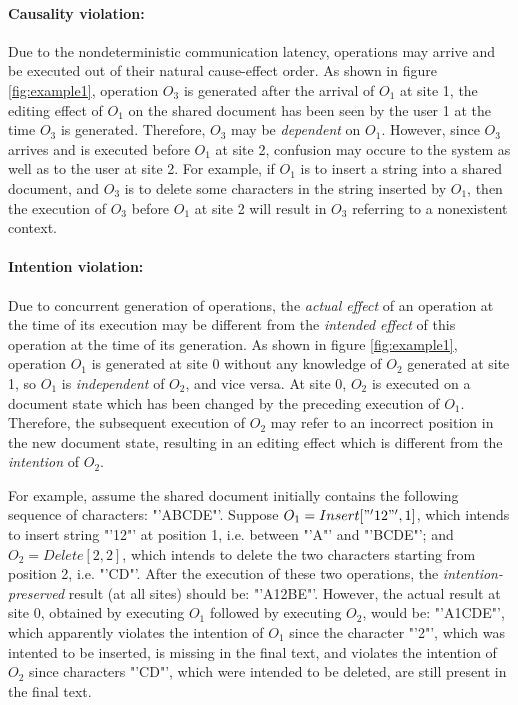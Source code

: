 \documentclass[11pt,a4paper]{article}
\begin{document}
\paragraph{Causality violation:}
Due to the nondeterministic communication latency, operations may arrive and be executed out of their natural cause-effect order. As shown in figure \ref{fig:example1}, operation $O_{3}$ is generated after the arrival of $O_{1}$ at site 1, the editing effect of $O_{1}$ on the shared document has been seen by the user 1 at the time $O_{3}$ is generated. Therefore, $O_{3}$ may be \emph{dependent} on $O_{1}$. However, since $O_{3}$ arrives and is executed before $O_{1}$ at site 2, confusion may occure to the system as well as to the user at site 2. For example, if $O_{1}$ is to insert a string into a shared document, and $O_{3}$ is to delete some characters in the string inserted by $O_{1}$, then the execution of $O_{3}$ before $O_{1}$ at site 2 will result in $O_{3}$ referring to a nonexistent context. 

\paragraph{Intention violation:}
Due to concurrent generation of operations, the \emph{actual effect} of an operation at the time of its execution may be different from the \emph{intended effect} of this operation at the time of its generation. As shown in figure \ref{fig:example1}, operation $O_{1}$ is generated at site 0 without any knowledge of $O_{2}$ generated at site 1, so $O_{1}$ is \emph{independent} of $O_{2}$, and vice versa. At site 0, $O_{2}$ is executed on a document state which has been changed by the preceding execution of $O_{1}$. Therefore, the subsequent execution of $O_{2}$ may refer to an incorrect position in the new document state, resulting in an editing effect which is different from the \emph{intention} of $O_{2}$. 

For example, assume the shared document initially contains the following sequence of characters: "'ABCDE"'. Suppose $O_{1}=Insert["'12"',1]$, which intends to insert string "'12"' at position 1, i.e. between "'A"' and "'BCDE"'; and $O_{2}=Delete[2,2]$, which intends to delete the two characters starting from position 2, i.e. "'CD"'. After the execution of these two operations, the \emph{intention-preserved} result (at all sites) should be: "'A12BE"'. However, the actual result at site 0, obtained by executing $O_{1}$ followed by executing $O_{2}$, would be: "'A1CDE"', which apparently violates the intention of $O_{1}$ since the character "'2"', which was intented to be inserted, is missing in the final text, and violates the intention of $O_{2}$ since characters "'CD"', which were intended to be deleted, are still present in the final text.
\end{document}
